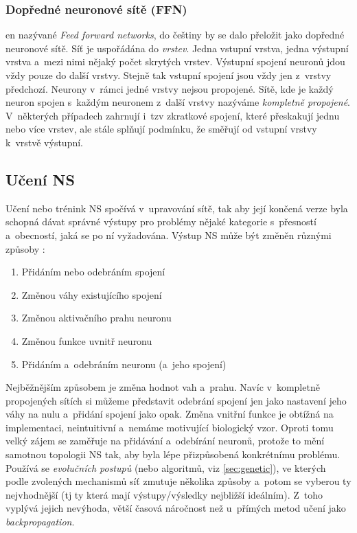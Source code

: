 \documentclass[12pt,oneside]{report}			%
\begin{document}
	\subsubsection{Dopředné neuronové sítě (\gls{FFN})}
	\label{sec:NN-FFN} 
	\Gls{en} nazývané \emph{Feed forward networks}, do češtiny by se dalo přeložit jako dopředné neuronové sítě. Síť je uspořádána do \emph{vrstev}. Jedna vstupní vrstva, jedna výstupní vrstva a~mezi nimi nějaký počet skrytých vrstev. Výstupní spojení neuronů jdou vždy pouze do další vrstvy. Stejně tak vstupní spojení jsou vždy jen z~vrstvy předchozí. Neurony v~rámci jedné vrstvy nejsou propojené. Sítě, kde je každý neuron spojen s~každým neuronem z~další vrstvy nazýváme \emph{kompletně propojené}. V~některých případech zahrnují i~\gls{tzv} zkratkové spojení, které přeskakují jednu nebo více vrstev, ale stále splňují podmínku, že směřují od vstupní vrstvy k~vrstvě výstupní. \parencite[\gls{str} 39-40]{NN_introduction-Kriessel}\\
	
	\subsection{Učení \gls{NS}}
	Učení nebo trénink \gls{NS} spočívá v~upravování sítě, tak aby její končená verze byla schopná dávat správné výstupy pro problémy nějaké kategorie s~přesností a~obecností, jaká se po ní vyžadována. Výstup \gls{NS} může být změněn různými způsoby \parencite[\gls{s} 51]{NN_introduction-Kriessel}:
	\begin{enumerate}
	\item{Přidáním nebo odebráním spojení}
	\item{Změnou váhy existujícího spojení}
	\item{Změnou aktivačního prahu neuronu}
	\item{Změnou funkce uvnitř neuronu}
	\item{Přidáním a~odebráním neuronu (a~jeho spojení)}
	\end{enumerate}
	Nejběžnějším způsobem je změna hodnot vah a~prahu. Navíc v~kompletně propojených sítích si můžeme představit odebrání spojení jen jako nastavení jeho váhy na nulu a~přidání spojení jako opak. Změna vnitřní funkce je obtížná na implementaci, neintuitivní a~nemáme motivující biologický vzor. Oproti tomu velký zájem se zaměřuje na přidávání a~odebírání neuronů, protože to mění samotnou topologii \gls{NS} tak, aby byla lépe přizpůsobená konkrétnímu problému. Používá se \emph{evolučních postupů} (nebo algoritmů, \gls{viz} \ref{sec:genetic}), ve kterých podle zvolených mechanismů síť zmutuje několika způsoby a~potom se vyberou ty nejvhodnější (\gls{tj} ty která mají výstupy/výsledky nejbližší ideálním). Z~toho vyplývá jejich nevýhoda, větší časová náročnost než u~přímých metod učení jako \emph{backpropagation}. \parencite[\gls{s} 52,127]{NN_introduction-Kriessel}\\
	
\end{document}
